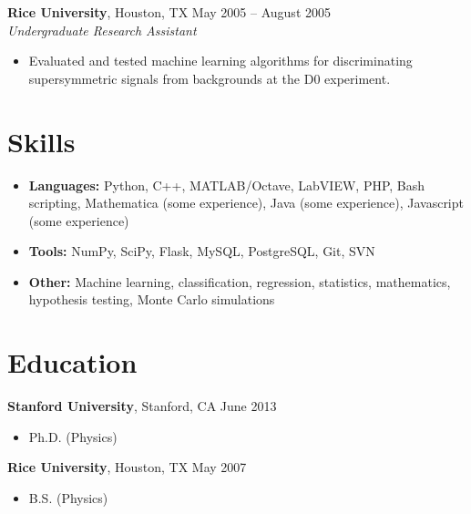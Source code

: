 \documentclass[margin,line]{resume}
\begin{document}
\begin{resume}
    \textbf{Rice University}, Houston, TX \hfill May 2005 -- August 2005 \vspace{1mm}\\\vspace{1mm}%
    \textsl{Undergraduate Research Assistant}
    \begin{itemize}
    \item Evaluated and tested machine learning algorithms for discriminating supersymmetric signals from backgrounds at the D0 experiment.
    \end{itemize}
    
    \section{\mysidestyle Skills}\vspace{0mm}%
    \begin{itemize}
    \item \textbf{Languages:} Python, C++, MATLAB/Octave, LabVIEW, PHP, Bash scripting, Mathematica (some experience), Java (some experience), Javascript (some experience)
    \item \textbf{Tools:} NumPy, SciPy, Flask, MySQL, PostgreSQL, Git, SVN
    \item \textbf{Other:} Machine learning, classification, regression, statistics, mathematics, hypothesis testing, Monte Carlo simulations
    \end{itemize}
    
    \section{\mysidestyle Education}

    \textbf{Stanford University}, Stanford, CA \hfill June 2013\vspace{-3mm}\\\vspace{-1mm}%
    \begin{itemize}
    \item Ph.D. (Physics)
    \end{itemize}\vspace{-1.5mm}
    
    \textbf{Rice University}, Houston, TX \hfill May 2007\vspace{-3mm}\\\vspace{-1mm}%
    \begin{itemize}
    \item B.S. (Physics)
    \end{itemize}\vspace{-1.5mm}
 

\end{resume}
\end{document}

